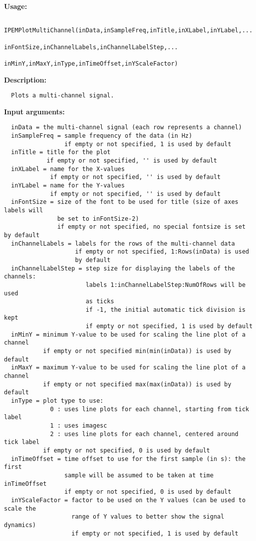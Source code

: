 \textbf{Usage:}
\begin{verbatim}  IPEMPlotMultiChannel(inData,inSampleFreq,inTitle,inXLabel,inYLabel,...
                       inFontSize,inChannelLabels,inChannelLabelStep,...
                       inMinY,inMaxY,inType,inTimeOffset,inYScaleFactor)

\end{verbatim}
\textbf{Description:}
\begin{verbatim}  Plots a multi-channel signal.

\end{verbatim}
\textbf{Input arguments:}
\begin{verbatim}  inData = the multi-channel signal (each row represents a channel)
  inSampleFreq = sample frequency of the data (in Hz)
                 if empty or not specified, 1 is used by default
  inTitle = title for the plot
            if empty or not specified, '' is used by default
  inXLabel = name for the X-values
             if empty or not specified, '' is used by default
  inYLabel = name for the Y-values
             if empty or not specified, '' is used by default
  inFontSize = size of the font to be used for title (size of axes labels will
               be set to inFontSize-2)
               if empty or not specified, no special fontsize is set by default
  inChannelLabels = labels for the rows of the multi-channel data
                    if empty or not specified, 1:Rows(inData) is used
                    by default
  inChannelLabelStep = step size for displaying the labels of the channels:
                       labels 1:inChannelLabelStep:NumOfRows will be used
                       as ticks
                       if -1, the initial automatic tick division is kept
                       if empty or not specified, 1 is used by default
  inMinY = minimum Y-value to be used for scaling the line plot of a channel
           if empty or not specified min(min(inData)) is used by default
  inMaxY = maximum Y-value to be used for scaling the line plot of a channel
           if empty or not specified max(max(inData)) is used by default
  inType = plot type to use:
             0 : uses line plots for each channel, starting from tick label
             1 : uses imagesc
             2 : uses line plots for each channel, centered around tick label
           if empty or not specified, 0 is used by default
  inTimeOffset = time offset to use for the first sample (in s): the first
                 sample will be assumed to be taken at time inTimeOffset
                 if empty or not specified, 0 is used by default
  inYScaleFactor = factor to be used on the Y values (can be used to scale the 
                   range of Y values to better show the signal dynamics)
                   if empty or not specified, 1 is used by default

\end{verbatim}
